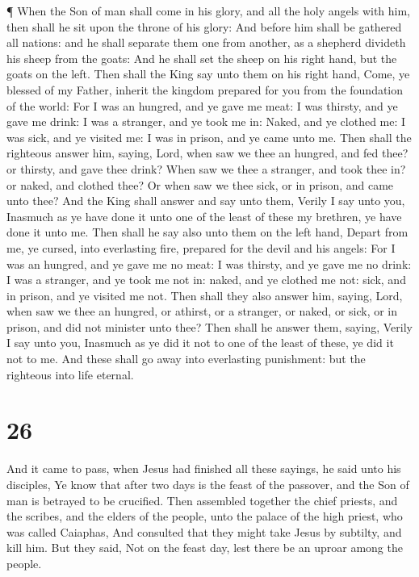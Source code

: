  ¶ When the Son of man shall come in his glory, and all the
holy angels with him, then shall he sit upon the throne of his glory:
 And before him shall be gathered all nations: and he shall
separate them one from another, as a shepherd divideth his sheep from
the goats:  And he shall set the sheep on his right hand,
but the goats on the left.  Then shall the King say unto
them on his right hand, Come, ye blessed of my Father, inherit the
kingdom prepared for you from the foundation of the world: 
For I was an hungred, and ye gave me meat: I was thirsty, and ye gave me
drink: I was a stranger, and ye took me in:  Naked, and ye
clothed me: I was sick, and ye visited me: I was in prison, and ye came
unto me.  Then shall the righteous answer him, saying,
Lord, when saw we thee an hungred, and fed thee? or thirsty, and gave
thee drink?  When saw we thee a stranger, and took thee in?
or naked, and clothed thee?  Or when saw we thee sick, or
in prison, and came unto thee?  And the King shall answer
and say unto them, Verily I say unto you, Inasmuch as ye have done it
unto one of the least of these my brethren, ye have done it unto me.
 Then shall he say also unto them on the left hand, Depart
from me, ye cursed, into everlasting fire, prepared for the devil and
his angels:  For I was an hungred, and ye gave me no meat:
I was thirsty, and ye gave me no drink:  I was a stranger,
and ye took me not in: naked, and ye clothed me not: sick, and in
prison, and ye visited me not.  Then shall they also answer
him, saying, Lord, when saw we thee an hungred, or athirst, or a
stranger, or naked, or sick, or in prison, and did not minister unto
thee?  Then shall he answer them, saying, Verily I say unto
you, Inasmuch as ye did it not to one of the least of these, ye did it
not to me.  And these shall go away into everlasting
punishment: but the righteous into life eternal.

\hypertarget{section-25}{%
\section{26}\label{section-25}}

 And it came to pass, when Jesus had finished all these
sayings, he said unto his disciples,  Ye know that after two
days is the feast of the passover, and the Son of man is betrayed to be
crucified.  Then assembled together the chief priests, and
the scribes, and the elders of the people, unto the palace of the high
priest, who was called Caiaphas,  And consulted that they
might take Jesus by subtilty, and kill him.  But they said,
Not on the feast day, lest there be an uproar among the people.


